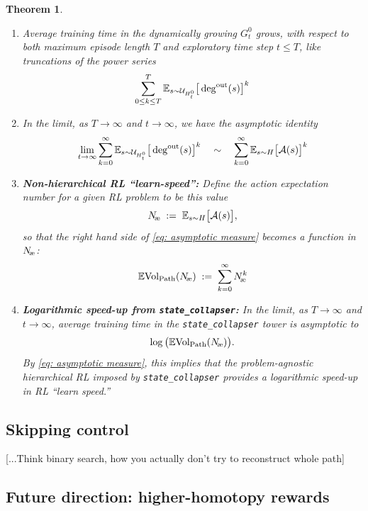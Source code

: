 \documentclass[11pt]{article}
\newtheorem{theorem}{Theorem}
\begin{document}
\begin{theorem}
\begin{enumerate}
\item
Average training time in the dynamically growing $G^{0}_{t}$ grows, with respect to both {\em maximum episode length} $T$ and {\em exploratory time step} $t\le T$, like truncations of the power series
$$
\sum^{T}_{0\le k \le T}\mathbb{E}_{s\sim\mathcal{U}_{H^{0}_{t}}}\big[\deg^{\text{{\normalfont out}}}(s)\big]^{k}
$$
\item
In the limit, as $T\to\infty$ and $t\to\infty$, we have the asymptotic identity
\begin{equation}\label{eq: asymptotic measure}
\underset{t\to\infty}{\operatorname{lim}}\sum^{\infty}_{k=0}\mathbb{E}_{s\sim\mathcal{U}_{H^{0}_{t}}}\big[\deg^{\text{{\normalfont out}}}(s)\big]^{k}
\quad\sim\quad
\sum^{\infty}_{k=0}\mathbb{E}_{s\sim H}\big[\mathcal{A}(s)\big]^{k}
\end{equation}
\item
{\bf Non-hierarchical RL ``learn-speed'':}
Define the {\em action expectation number} for a given RL problem to be this value
$$
N_\text{\!{\normalfont \ae}}\;:=\;\mathbb{E}_{s\sim H}\big[\mathcal{A}(s)\big],
$$
so that the right hand side of \eqref{eq: asymptotic measure} becomes a function in $N_\text{\!{\normalfont \ae}}$:
$$
\mathbb{E}\text{{\normalfont Vol}}_\text{{\normalfont Path}}(N_\text{\!{\normalfont \ae}})
\;:=\;\sum_{k=0}^{\infty}N_\text{\!{\normalfont \ae}}^{k}
$$
\item
{\bf Logarithmic speed-up from {\bf\texttt{state\_collapser}}:}
In the limit, as $T\to\infty$ and $t\to\infty$, average training time in the {\normalfont \texttt{state\_collapser}} tower is asymptotic to
$$
\log\big(\mathbb{E}\text{{\normalfont Vol}}_\text{{\normalfont Path}}(N_\text{\!{\normalfont \ae}})\big).
$$
By \eqref{eq: asymptotic measure}, this implies that the problem-agnostic hierarchical RL imposed by {\normalfont \texttt{state\_collapser}} provides a logarithmic speed-up in RL ``learn speed.''
\end{enumerate}
\end{theorem}

\subsection{Skipping control}

[...Think binary search, how you actually don't try to reconstruct whole path]

\subsection{Future direction: higher-homotopy rewards}



\end{document}
